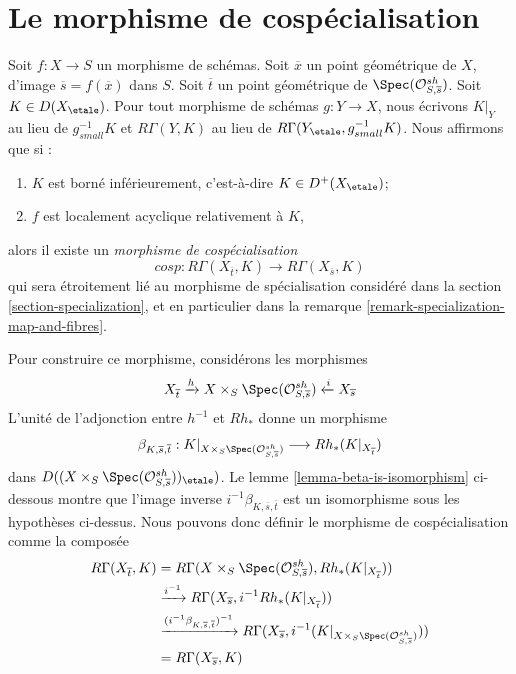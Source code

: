 \section{Le morphisme de cospécialisation}
\label{section-cospecialization}

\noindent
Soit $f : X \to S$ un morphisme de schémas. Soit $\overline{x}$ un
point géométrique de $X$, d'image $\overline{s} = f(\overline{x})$ dans $S$.
Soit $\overline{t}$ un point géométrique de
$\Spec(\mathcal{O}^{sh}_{S, \overline{s}})$.
Soit $K \in D(X_\etale)$. Pour tout morphisme de schémas $g : Y \to X$,
nous écrivons $K|_Y$ au lieu de $g_{small}^{-1}K$ et $R\Gamma(Y, K)$
au lieu de $R\Gamma(Y_\etale, g_{small}^{-1}K)$.
Nous affirmons que si :
\begin{enumerate}
\item $K$ est borné inférieurement, c'est-à-dire $K \in D^+(X_\etale)$;
\item $f$ est localement acyclique relativement à $K$,
\end{enumerate}
alors il existe un {\it morphisme de cospécialisation}
$$
cosp :
R\Gamma(X_{\overline{t}}, K)
\longrightarrow
R\Gamma(X_{\overline{s}}, K)
$$
qui sera étroitement lié au morphisme de spécialisation
considéré dans la section \ref{section-specialization}, et en particulier
dans la remarque \ref{remark-specialization-map-and-fibres}.

\medskip\noindent
Pour construire ce morphisme, considérons les morphismes
$$
X_{\overline{t}}
\xrightarrow{h}
X \times_S \Spec(\mathcal{O}^{sh}_{S, \overline{s}})
\xleftarrow{i}
X_{\overline{s}}
$$
L'unité de l'adjonction entre $h^{-1}$ et $Rh_*$ donne un morphisme
$$
\beta_{K, \overline{s}, \overline{t}} :
K|_{X \times_S \Spec(\mathcal{O}^{sh}_{S, \overline{s}})}
\longrightarrow
Rh_*(K|_{X_{\overline{t}}})
$$
dans $D((X \times_S \Spec(\mathcal{O}^{sh}_{S, \overline{s}}))_\etale)$.
Le lemme \ref{lemma-beta-is-isomorphism} ci-dessous montre que l'image inverse
$i^{-1}\beta_{K, \overline{s}, \overline{t}}$
est un isomorphisme sous les hypothèses ci-dessus.
Nous pouvons donc définir le morphisme de cospécialisation comme la composée
\begin{align*}
R\Gamma(X_{\overline{t}}, K)
& =
R\Gamma(X \times_S \Spec(\mathcal{O}^{sh}_{S, \overline{s}}),
Rh_*(K|_{X_{\overline{t}}})) \\
&
\xrightarrow{i^{-1}}
R\Gamma(X_{\overline{s}}, i^{-1}Rh_*(K|_{X_{\overline{t}}})) \\
&
\xrightarrow{(i^{-1}\beta_{K, \overline{s}, \overline{t}})^{-1}}
R\Gamma(X_{\overline{s}},
i^{-1}(K|_{X \times_S \Spec(\mathcal{O}^{sh}_{S, \overline{s}})})) \\
& =
R\Gamma(X_{\overline{s}}, K)
\end{align*}

